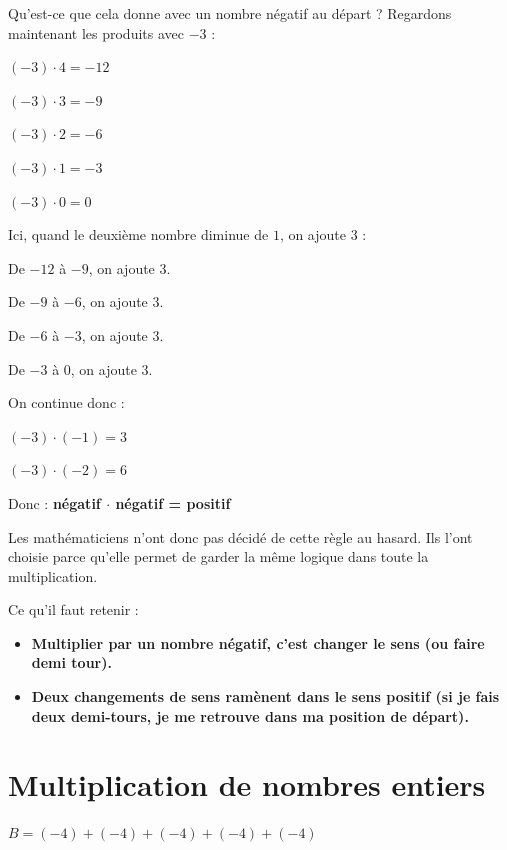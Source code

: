 \documentclass[../../syllabus_1.tex]{subfiles}
\begin{document}
Qu'est-ce que cela donne avec un nombre négatif au départ ?
Regardons maintenant les produits avec $-3$ :

\((-3) \cdot 4 = -12 \)

\((-3) \cdot 3 = -9 \)

\((-3) \cdot 2 = -6 \)

\((-3) \cdot 1 = -3 \)

\((-3) \cdot 0 = 0 \)

Ici, quand le deuxième nombre diminue de $1$, on ajoute $3$ :

De $-12$ à $-9$, on ajoute $3$.

De $-9$ à $-6$, on ajoute $3$.

De $-6$ à $-3$, on ajoute $3$.

De $-3$ à $0$, on ajoute $3$.

On continue donc :

\((-3) \cdot (-1) = 3 \)

\((-3) \cdot (-2) = 6 \)

Donc : \textbf{négatif \(\cdot \) négatif = positif}

Les mathématiciens n'ont donc pas décidé de cette règle au hasard. Ils l'ont choisie parce qu'elle permet de garder la même logique dans toute la multiplication.

Ce qu'il faut retenir : 
\begin{itemize}
    \item \textbf{Multiplier par un nombre négatif, c'est changer le sens (ou faire demi tour).}
    \item \textbf{Deux changements de sens ramènent dans le sens positif (si je fais deux demi-tours, je me retrouve dans ma position de départ).}
\end{itemize}

\newpage
\section{Multiplication de nombres entiers}

\(B=\left(-4\right)+\left(-4\right)+\left(-4\right)+\left(-4\right)+\left(-4\right)\)
\end{document}
